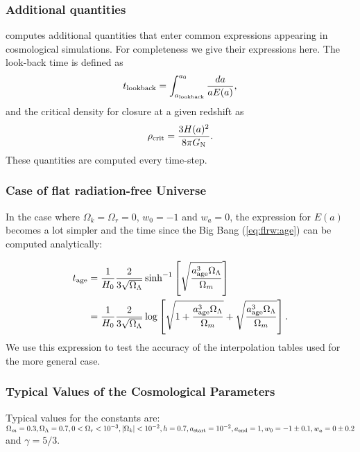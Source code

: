 \subsubsection{Additional quantities}

\swift computes additional quantities that enter common expressions appearing in
cosmological simulations. For completeness we give their expressions here. The
look-back time is defined as
\begin{equation}
  t_{\rm lookback} = \int_{a_{\rm lookback}}^{a_0} \frac{da}{a E(a)},
\end{equation}
and the critical density for closure at a given redshift as
\begin{equation}
  \rho_{\rm crit} = \frac{3H(a)^2}{8\pi G_{\rm{N}}}.
\end{equation}
These quantities are computed every time-step.

\subsubsection{Case of flat radiation-free Universe}

In the case where $\Omega_k = \Omega_r = 0$, $w_0=-1$ and $w_a = 0$, the
expression for $E(a)$ becomes a lot simpler and the time since the Big
Bang (\ref{eq:flrw:age}) can be computed analytically:

\begin{align}
  t_{\rm age} &= \frac{1}{H_0}\frac{2}{3\sqrt{\Omega_\Lambda}} \sinh^{-1}\left[\sqrt{\frac{a_{\rm age}^3 \Omega_\Lambda}{\Omega_m}}\right] \\
              &= \frac{1}{H_0}\frac{2}{3\sqrt{\Omega_\Lambda}}
\log\left[\sqrt{1+\frac{a_{\rm age}^3 \Omega_\Lambda}{\Omega_m}} + \sqrt{\frac{a_{\rm age}^3 \Omega_\Lambda}{\Omega_m}}\right].
\end{align}
We use this expression to test the accuracy of the interpolation
tables used for the more general case.

\subsubsection{Typical Values of the Cosmological Parameters}

Typical values for the constants are: $\Omega_m = 0.3, \Omega_\Lambda=0.7, 0 <
\Omega_r<10^{-3}, |\Omega_k | < 10^{-2}, h=0.7, a_{\rm start} = 10^{-2}, a_{\rm
end} = 1, w_0 = -1\pm 0.1, w_a=0\pm0.2$ and $\gamma = 5/3$.
